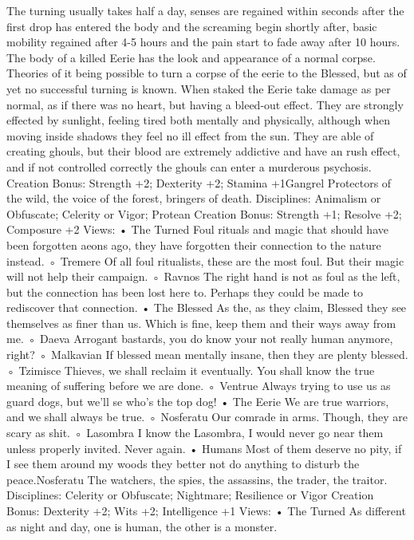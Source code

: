 \documentclass[10pt,a4paper]{article}
\begin{document}
The turning usually takes half a day, senses are regained within seconds
after the first drop has entered the body and the screaming begin shortly
after, basic mobility regained after 4-5 hours and the pain start to fade away
after 10 hours.
The body of a killed Eerie has the look and appearance of a normal corpse.
Theories of it being possible to turn a corpse of the eerie to the Blessed, but
as of yet no successful turning is known.
When staked the Eerie take damage as per normal, as if there was no heart,
but having a bleed-out effect. They are strongly effected by sunlight, feeling
tired both mentally and physically, although when moving inside shadows
they feel no ill effect from the sun. They are able of creating ghouls, but
their blood are extremely addictive and have an rush effect, and if not
controlled correctly the ghouls can enter a murderous psychosis.
Creation Bonus:
Strength +2; Dexterity +2; Stamina +1Gangrel
Protectors of the wild, the voice of the forest, bringers of death.
Disciplines: Animalism or Obfuscate; Celerity or Vigor; Protean
Creation Bonus:
Strength +1; Resolve +2; Composure +2
Views:
• The Turned
Foul rituals and magic that should have been forgotten aeons ago,
they have forgotten their connection to the nature instead.
◦ Tremere
Of all foul ritualists, these are the most foul. But their magic will
not help their campaign.
◦ Ravnos
The right hand is not as foul as the left, but the connection has
been lost here to. Perhaps they could be made to rediscover that
connection.
• The Blessed
As the, as they claim, Blessed they see themselves as finer than us.
Which is fine, keep them and their ways away from me.
◦ Daeva
Arrogant bastards, you do know your not really human anymore,
right?
◦ Malkavian
If blessed mean mentally insane, then they are plenty blessed.
◦ Tzimisce
Thieves, we shall reclaim it eventually. You shall know the true
meaning of suffering before we are done.
◦ Ventrue
Always trying to use us as guard dogs, but we'll se who's the top
dog!
• The Eerie
We are true warriors, and we shall always be true.
◦ Nosferatu
Our comrade in arms. Though, they are scary as shit.
◦ Lasombra
I know the Lasombra, I would never go near them unless
properly invited. Never again.
• Humans
Most of them deserve no pity, if I see them around my woods they
better not do anything to disturb the peace.Nosferatu
The watchers, the spies, the assassins, the trader, the traitor.
Disciplines: Celerity or Obfuscate; Nightmare; Resilience or Vigor
Creation Bonus:
Dexterity +2; Wits +2; Intelligence +1
Views:
• The Turned
As different as night and day, one is human, the other is a monster.
\end{document}
